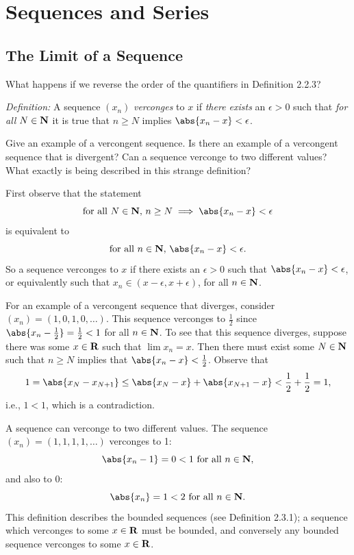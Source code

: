 \documentclass{lew98_solutions}
\begin{document}
\chapter{Sequences and Series}
\label{chap:2}

\setcounter{section}{1}
\section{The Limit of a Sequence}
\label{sec:2.2}

\begin{exercise}
\label{ex:2.2.1}
    What happens if we reverse the order of the quantifiers in Definition 2.2.3?

    \textit{Definition:} A sequence \( (x_n) \) \textit{verconges} to \( x \) if \textit{there exists} an \( \epsilon > 0 \) such that \textit{for all} \( N \in \mathbf{N} \) it is true that \( n \geq N \) implies \( \abs{x_n - x} < \epsilon \).

    Give an example of a vercongent sequence. Is there an example of a vercongent sequence that is divergent? Can a sequence verconge to two different values? What exactly is being described in this strange definition?
\end{exercise}

\begin{solution}
    First observe that the statement
    \[
        \text{for all } N \in \N,\, n \geq N \implies \abs{x_n - x} < \epsilon
    \]
    is equivalent to
    \[
        \text{for all } n \in \N,\, \abs{x_n - x} < \epsilon.
    \]
    So a sequence verconges to \( x \) if there exists an \( \epsilon > 0 \) such that \( \abs{x_n - x} < \epsilon \), or equivalently such that \( x_n \in (x - \epsilon, x + \epsilon) \), for all \( n \in \mathbf{N} \).

    For an example of a vercongent sequence that diverges, consider \( (x_n) = (1, 0, 1, 0, \ldots) \). This sequence verconges to \( \tfrac{1}{2} \) since \( \abs{x_n - \tfrac{1}{2}} = \tfrac{1}{2} < 1 \) for all \( n \in \mathbf{N} \). To see that this sequence diverges, suppose there was some \( x \in \mathbf{R} \) such that \( \lim x_n = x \). Then there must exist some \( N \in \mathbf{N} \) such that \( n \geq N \) implies that \( \abs{x_n - x} < \tfrac{1}{2} \). Observe that
    \[
        1 = \abs{x_N - x_{N+1}} \leq \abs{x_N - x} + \abs{x_{N+1} - x} < \frac{1}{2} + \frac{1}{2} = 1,
    \]
    i.e., \( 1 < 1 \), which is a contradiction.

    A sequence can verconge to two different values. The sequence \( (x_n) = (1, 1, 1, 1, \ldots) \) verconges to 1:
    \[
        \abs{x_n - 1} = 0 < 1 \text{ for all } n \in \N,
    \]
    and also to 0:
    \[
        \abs{x_n} = 1 < 2 \text{ for all } n \in \N.
    \]
    This definition describes the bounded sequences (see Definition 2.3.1); a sequence which verconges to some \( x \in \mathbf{R} \) must be bounded, and conversely any bounded sequence verconges to some \( x \in \mathbf{R} \).
\end{solution}
\end{document}
